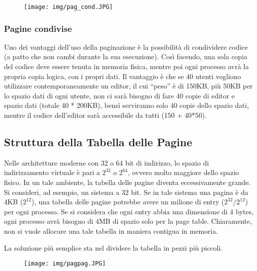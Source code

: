 \documentclass[a4paper]{article}
\begin{document}
\begin{figure}[h!]
    \centering
    \texttt{[image: img/pag\_cond.JPG]}
\end{figure}

\subsubsection{Pagine condivise}
Uno dei vantaggi dell'uso della paginazione è la possibilità di condividere codice (a patto che non cambi durante la sua esecuzione). Così facendo, una sola copia del codice deve essere tenuta in memoria fisica, mentre poi ogni processo avrà la propria copia logica, con i propri dati. Il vantaggio è che se 40 utenti vogliono utilizzare contemporaneamente un editor, il cui ``peso'' è di 150KB, più 50KB per lo spazio dati di ogni utente, non ci sarà bisogno di fare 40 copie di editor e spazio dati (totale 40 * 200KB), bensì serviranno solo 40 copie dello spazio dati, mentre il codice dell'editor sarà accessibile da tutti (150 + 40*50).

\subsection{Struttura della Tabella delle Pagine}
Nelle architetture moderne con 32 o 64 bit di indirizzo, lo spazio di indirizzamento virtuale è pari a $2^32$ o $2^64$, ovvero molto maggiore dello spazio fisico. In un tale ambiente, la tabella delle pagine diventa eccessivamente grande. Si consideri, ad esempio, un sistema a 32 bit. Se in tale sistema una pagina è da 4KB ($2^12$), una tabella delle pagine potrebbe avere un milione di entry ($2^32 / 2^12$) per ogni processo. Se si considera che ogni entry abbia una dimensione di 4 bytes, ogni processo avrà bisogno di 4MB di spazio solo per la page table. Chiaramente, non si vuole allocare una tale tabella in maniera contigua in memoria.

La soluzione più semplice sta nel dividere la tabella in pezzi più piccoli.

\begin{figure}[h!]
    \centering
    \texttt{[image: img/pagpag.JPG]}
\end{figure}
\end{document}
